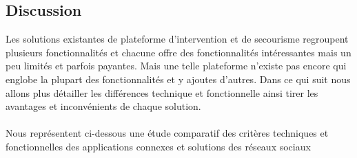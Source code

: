 \documentclass[11pt,a4paper,oneside]{book}
\begin{document}
	\subsection{Discussion}
	Les solutions existantes de plateforme d’intervention et de secourisme regroupent plusieurs fonctionnalités et chacune offre des fonctionnalités intéressantes mais un peu limités et parfois payantes. Mais une telle plateforme n’existe pas encore qui englobe la plupart des fonctionnalités et y ajoutes d’autres. Dans ce qui suit nous allons plus détailler les différences technique et fonctionnelle ainsi tirer les avantages et inconvénients de chaque solution.\\ \\
	Nous représentent ci-dessous une étude comparatif des critères techniques et fonctionnelles des applications connexes et solutions des réseaux sociaux \\
\end{document}
